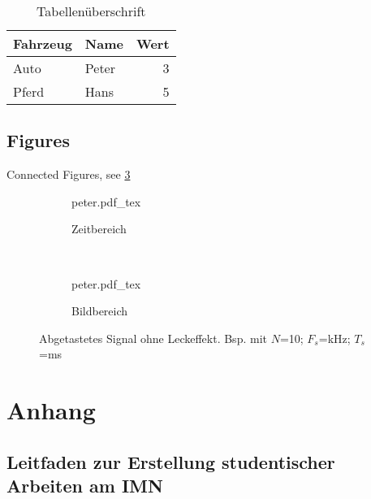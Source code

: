 \documentclass[12pt,
titlepage,
a4paper,
oneside,     %
openany,     %
listof=totoc,  %
numbers = noenddot, %
bibliography=totoc,    %
headsepline, %
]{scrbook} %
\begin{document}
\begin{table}
	\caption{Tabellenüberschrift}
	\label{tab_ExampleTable}
	\centering
	\begin{tabular}{l l r}
		Fahrzeug & Name & Wert \\
		\toprule
		Auto & Peter & 3  \\ 
		Pferd & Hans & 5  \\
	\end{tabular}
\end{table}

\section{Figures}
\label{sec_figures}

Connected Figures, see \ref{fig:leck_toll}
\begin{figure}
	\centering
	\begin{subfigure}[b]{0.48\textwidth}
		\def\svgwidth{\columnwidth}
		{peter.pdf_tex}
		\caption{Zeitbereich}
		\label{leck_toll_t}
	\end{subfigure}
	~
	\begin{subfigure}[b]{0.48\textwidth}
		\def\svgwidth{\columnwidth}
		{peter.pdf_tex}
		\caption{Bildbereich}
		\label{leck_toll_f}
	\end{subfigure}
	\caption{Abgetastetes Signal ohne Leckeffekt. Bsp. mit $N$=10; $F_s$=\unit[1]{kHz}; $T_s$=\unit[10]{ms}}
	\label{fig:leck_toll}
\end{figure}


\printbibliography

\label{letzteSeite}
\appendix

\chapter{Anhang}
\label{cha_ausb}

\section{Leitfaden zur Erstellung studentischer Arbeiten am IMN}
\label{sec_Leitfaden}

\end{document}
